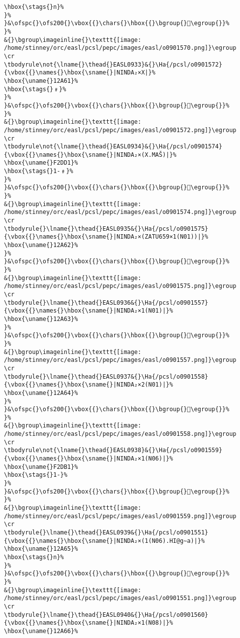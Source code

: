 \begin{verbatim}
\hbox{\stags{}n}%
}%
}&\ofspc{}\ofs200{}\vbox{{}\chars{}\hbox{{}\bgroup{}𒩟\egroup{}}%
}%
&{}\bgroup\imageinline{}\texttt{[image: /home/stinney/orc/easl/pcsl/pepc/images/easl/o0901570.png]}\egroup
\cr
\tbodyrule\not{\lname{}\thead{}EASL0933}&{}\Ha{/pcsl/o0901572}{\vbox{{}\names{}\hbox{\sname{}|NINDA₂×X|}%
\hbox{\uname{}12A61}%
\hbox{\stags{}﹟}%
}%
}&\ofspc{}\ofs200{}\vbox{{}\chars{}\hbox{{}\bgroup{}𒩡\egroup{}}%
}%
&{}\bgroup\imageinline{}\texttt{[image: /home/stinney/orc/easl/pcsl/pepc/images/easl/o0901572.png]}\egroup
\cr
\tbodyrule\not{\lname{}\thead{}EASL0934}&{}\Ha{/pcsl/o0901574}{\vbox{{}\names{}\hbox{\sname{}|NINDA₂×(X.MAŠ)|}%
\hbox{\uname{}F2DD1}%
\hbox{\stags{}1-﹟}%
}%
}&\ofspc{}\ofs200{}\vbox{{}\chars{}\hbox{{}\bgroup{}󲷑\egroup{}}%
}%
&{}\bgroup\imageinline{}\texttt{[image: /home/stinney/orc/easl/pcsl/pepc/images/easl/o0901574.png]}\egroup
\cr
\tbodyrule{}\lname{}\thead{}EASL0935&{}\Ha{/pcsl/o0901575}{\vbox{{}\names{}\hbox{\sname{}|NINDA₂×(ZATU659×1(N01))|}%
\hbox{\uname{}12A62}%
}%
}&\ofspc{}\ofs200{}\vbox{{}\chars{}\hbox{{}\bgroup{}𒩢\egroup{}}%
}%
&{}\bgroup\imageinline{}\texttt{[image: /home/stinney/orc/easl/pcsl/pepc/images/easl/o0901575.png]}\egroup
\cr
\tbodyrule{}\lname{}\thead{}EASL0936&{}\Ha{/pcsl/o0901557}{\vbox{{}\names{}\hbox{\sname{}|NINDA₂×1(N01)|}%
\hbox{\uname{}12A63}%
}%
}&\ofspc{}\ofs200{}\vbox{{}\chars{}\hbox{{}\bgroup{}𒩣\egroup{}}%
}%
&{}\bgroup\imageinline{}\texttt{[image: /home/stinney/orc/easl/pcsl/pepc/images/easl/o0901557.png]}\egroup
\cr
\tbodyrule{}\lname{}\thead{}EASL0937&{}\Ha{/pcsl/o0901558}{\vbox{{}\names{}\hbox{\sname{}|NINDA₂×2(N01)|}%
\hbox{\uname{}12A64}%
}%
}&\ofspc{}\ofs200{}\vbox{{}\chars{}\hbox{{}\bgroup{}𒩤\egroup{}}%
}%
&{}\bgroup\imageinline{}\texttt{[image: /home/stinney/orc/easl/pcsl/pepc/images/easl/o0901558.png]}\egroup
\cr
\tbodyrule\not{\lname{}\thead{}EASL0938}&{}\Ha{/pcsl/o0901559}{\vbox{{}\names{}\hbox{\sname{}|NINDA₂×1(N06)|}%
\hbox{\uname{}F2DB1}%
\hbox{\stags{}1-}%
}%
}&\ofspc{}\ofs200{}\vbox{{}\chars{}\hbox{{}\bgroup{}󲶱\egroup{}}%
}%
&{}\bgroup\imageinline{}\texttt{[image: /home/stinney/orc/easl/pcsl/pepc/images/easl/o0901559.png]}\egroup
\cr
\tbodyrule{}\lname{}\thead{}EASL0939&{}\Ha{/pcsl/o0901551}{\vbox{{}\names{}\hbox{\sname{}|NINDA₂×(1(N06).HI@g∼a)|}%
\hbox{\uname{}12A65}%
\hbox{\stags{}n}%
}%
}&\ofspc{}\ofs200{}\vbox{{}\chars{}\hbox{{}\bgroup{}𒩥\egroup{}}%
}%
&{}\bgroup\imageinline{}\texttt{[image: /home/stinney/orc/easl/pcsl/pepc/images/easl/o0901551.png]}\egroup
\cr
\tbodyrule{}\lname{}\thead{}EASL0940&{}\Ha{/pcsl/o0901560}{\vbox{{}\names{}\hbox{\sname{}|NINDA₂×1(N08)|}%
\hbox{\uname{}12A66}%

\end{verbatim}
